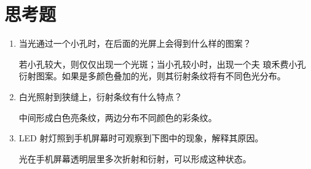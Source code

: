 \documentclass{article}
\begin{document}
\section*{思考题}
\begin{enumerate}
    \item 当光通过一个小孔时，在后面的光屏上会得到什么样的图案？
    
    若小孔较大，则仅仅出现一个光斑；当小孔较小时，出现一个夫
琅禾费小孔衍射图案。如果是多颜色叠加的光，则其衍射条纹将有不同色光分布。

    \item 白光照射到狭缝上，衍射条纹有什么特点？
    
    中间形成白色亮条纹，两边分布不同颜色的彩条纹。

    \item LED 射灯照到手机屏幕时可观察到下图中的现象，解释其原因。
    
    光在手机屏幕透明层里多次折射和衍射，可以形成这种状态。
\end{enumerate}
\end{document}
